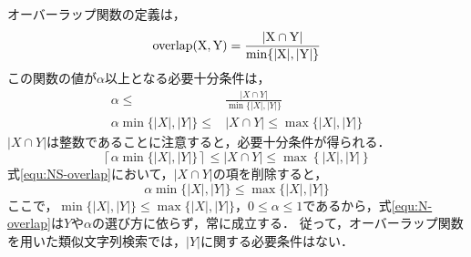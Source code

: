 \documentclass[japanese]{jnlp_JS2.0}
\begin{document}
オーバーラップ関数の定義は，
\begin{equation}
 \rm{overlap}(X, Y) = \frac{|X \cap Y|}{\min\{|X|, |Y|\}}
\end{equation}
この関数の値が$\alpha$以上となる必要十分条件は，
\begin{align}
 \alpha \leq& \frac{|X \cap Y|}{\min\{|X|, |Y|\}} \\
 \alpha \min\{|X|, |Y|\} \leq& |X \cap Y| \leq \max\{|X|, |Y|\} \label{equ:NS-overlap}
\end{align}
$|X \cap Y|$は整数であることに注意すると，必要十分条件が得られる．
\begin{equation}
 \left\lceil \alpha \min\{|X|, |Y|\} \right\rceil \leq |X \cap Y| \leq \max \left\{|X|, |Y|\right\}
\end{equation}
式\ref{equ:NS-overlap}において，$|X \cap Y|$の項を削除すると，
\begin{equation}
 \alpha \min\{|X|, |Y|\} \leq \max\{|X|, |Y|\} \label{equ:N-overlap}
\end{equation}
ここで，$\min\{|X|, |Y|\} \leq \max\{|X|, |Y|\}$，$0 \leq \alpha \leq 1$であるから，式\ref{equ:N-overlap}は$Y$や$\alpha$の選び方に依らず，常に成立する．
従って，オーバーラップ関数を用いた類似文字列検索では，$|Y|$に関する必要条件はない．
\end{document}
